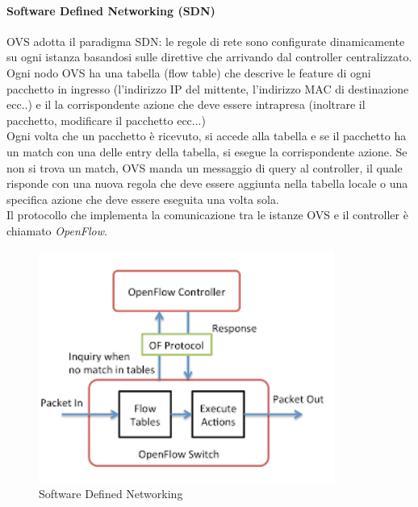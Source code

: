 \documentclass{article}
\begin{document}
\paragraph{Software Defined Networking (SDN)}
OVS adotta il paradigma SDN: le regole di rete sono configurate dinamicamente su ogni istanza basandosi sulle direttive che arrivando dal controller centralizzato. Ogni nodo OVS ha una tabella (flow table) che descrive le feature di ogni pacchetto in ingresso (l'indirizzo IP del mittente, l'indirizzo MAC di destinazione ecc..) e il la corrispondente azione che deve essere intrapresa (inoltrare il pacchetto, modificare il pacchetto ecc...) \\
Ogni volta che un pacchetto è ricevuto, si accede alla tabella e se il pacchetto ha un match con una delle entry della tabella, si esegue la corrispondente azione. Se non si trova un match, OVS manda un messaggio di query al controller, il quale risponde con una nuova regola che deve essere aggiunta nella tabella locale o una specifica azione che deve essere eseguita una volta sola. \\
Il protocollo che implementa la comunicazione tra le istanze OVS e il controller è chiamato \textit{OpenFlow}.
\begin{figure}[H]
    \centering
    \includegraphics[scale=0.9]{img/sdn.png}
    \caption{Software Defined Networking}
\end{figure}\noindent
\end{document}
